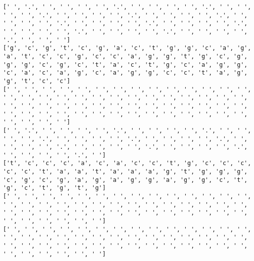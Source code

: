 \documentclass{article}
\begin{document}
\begin{Verbatim}
[' ', '.', ' ', ' ', ' ', ' ', '.', ' ', ' ', ' ', ' ', '.', ' ', ' ', ' ', ' ', '.', ' ', ' ', ' ', ' ', '.', ' ', ' ', ' ', ' ', '.', ' ', ' ', ' ', ' ', '.', ' ', ' ', ' ', ' ', '.', ' ', ' ', ' ', ' ', '.', ' ', ' ', ' ', ' ', '.', ' ', ' ', ' ', ' ', '.', ' ', ' ', ' ', ' ', '.', ' ', ' ', ' ']
['g', 'c', 'g', 't', 'c', 'g', 'a', 'c', 't', 'g', 'g', 'c', 'a', 'g', 'a', 't', 'c', 'c', 'g', 'c', 'c', 'a', 'g', 'g', 't', 'g', 'c', 'g', 'g', 'g', 'c', 'g', 'c', 't', 'a', 'c', 't', 'g', 'c', 'a', 'g', 'g', 'c', 'a', 'c', 'a', 'g', 'c', 'a', 'g', 'g', 'c', 'c', 't', 'a', 'g', 'g', 't', 'c', 'c']
[' ', ' ', ' ', ' ', ' ', ' ', ' ', ' ', ' ', ' ', ' ', ' ', ' ', ' ', ' ', ' ', ' ', ' ', ' ', ' ', ' ', ' ', ' ', ' ', ' ', ' ', ' ', ' ', ' ', ' ', ' ', ' ', ' ', ' ', ' ', ' ', ' ', ' ', ' ', ' ', ' ', ' ', ' ', ' ', ' ', ' ', ' ', ' ', ' ', ' ', ' ', ' ', ' ', ' ', ' ', ' ', ' ', ' ', ' ', ' ']
[' ', '.', ' ', ' ', ' ', ' ', '.', ' ', ' ', ' ', ' ', '.', ' ', ' ', ' ', ' ', '.', ' ', ' ', ' ', ' ', '.', ' ', ' ', ' ', ' ', '.', ' ', ' ', ' ', ' ', '.', ' ', ' ', ' ', ' ', '.', ' ', ' ', ' ', ' ', '.', ' ', ' ', ' ', ' ', '.', ' ']
['t', 'c', 'c', 'c', 'a', 'c', 'a', 'c', 'c', 't', 'g', 'c', 'c', 'c', 'c', 'c', 't', 'a', 'a', 't', 'a', 'a', 'a', 'g', 't', 'g', 'g', 'g', 'c', 'g', 'c', 'g', 'a', 'g', 'a', 'g', 'g', 'a', 'g', 'g', 'c', 't', 'g', 'c', 't', 'g', 't', 'g']
[' ', ' ', ' ', ' ', ' ', ' ', ' ', ' ', ' ', ' ', ' ', ' ', ' ', ' ', ' ', ' ', ' ', ' ', ' ', ' ', ' ', ' ', ' ', ' ', ' ', ' ', ' ', ' ', ' ', ' ', ' ', ' ', ' ', ' ', ' ', ' ', ' ', ' ', ' ', ' ', ' ', ' ', ' ', ' ', ' ', ' ', ' ', ' ']
[' ', ' ', ' ', ' ', ' ', ' ', ' ', ' ', ' ', ' ', ' ', ' ', ' ', ' ', ' ', ' ', ' ', ' ', ' ', ' ', ' ', ' ', ' ', ' ', ' ', ' ', ' ', ' ', ' ', ' ', ' ', ' ', ' ', ' ', ' ', ' ', ' ', ' ', ' ', ' ', ' ', ' ', ' ', ' ', ' ', ' ', ' ', ' ']
 

\end{Verbatim}
\end{document}
